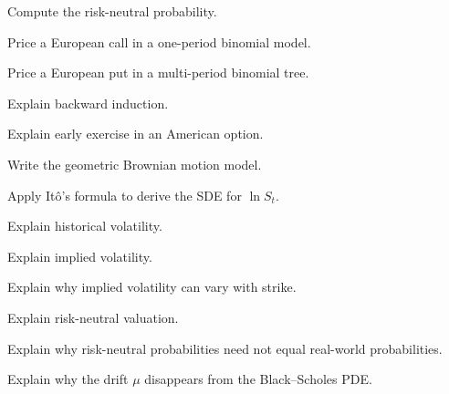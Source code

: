 \begin{exercise}[3]
Compute the risk-neutral probability.
\end{exercise}

\begin{exercise}[3]
Price a European call in a one-period binomial model.
\end{exercise}

\begin{exercise}[3]
Price a European put in a multi-period binomial tree.
\end{exercise}

\begin{exercise}[3]
Explain backward induction.
\end{exercise}

\begin{exercise}[3]
Explain early exercise in an American option.
\end{exercise}

\begin{exercise}[2]
Write the geometric Brownian motion model.
\end{exercise}

\begin{exercise}[3]
Apply It\^o's formula to derive the SDE for \(\ln S_t\).
\end{exercise}

\begin{exercise}[2]
Explain historical volatility.
\end{exercise}

\begin{exercise}[2]
Explain implied volatility.
\end{exercise}

\begin{exercise}[3]
Explain why implied volatility can vary with strike.
\end{exercise}

\begin{exercise}[2]
Explain risk-neutral valuation.
\end{exercise}

\begin{exercise}[3]
Explain why risk-neutral probabilities need not equal real-world
probabilities.
\end{exercise}

\begin{exercise}[3]
Explain why the drift \(\mu\) disappears from the Black--Scholes PDE.
\end{exercise}

